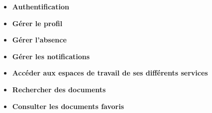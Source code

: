 \begin{itemize}
\item \textbf{Authentification}
\item \textbf{Gérer le profil}
\item \textbf{Gérer l'absence}
\item \textbf{Gérer les notifications}
\item \textbf{Accéder aux espaces de travail de ses différents services}
\item \textbf{Rechercher des documents}
\item \textbf{Consulter les documents favoris}

\end{itemize}
